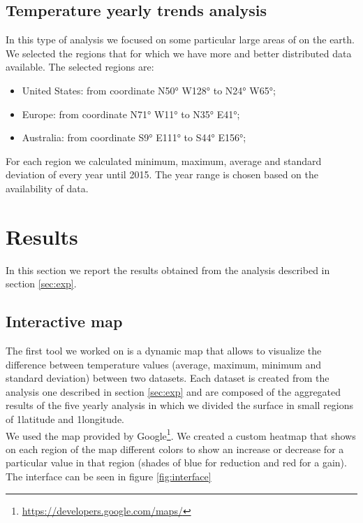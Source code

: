 \documentclass{vldb}
\begin{document}
\subsection{Temperature yearly trends analysis}
In this type of analysis we focused on some particular large areas of on the earth. We selected the regions that for which we have more and better distributed data available. The selected regions are:
\begin{itemize}
    \item United States: from coordinate N\ang{50;;} W\ang{128;;} to N\ang{24;;} W\ang{65;;};
    \item Europe: from coordinate N\ang{71;;} W\ang{11;;} to N\ang{35;;} E\ang{41;;};
    \item Australia: from coordinate S\ang{9;;} E\ang{111;;} to S\ang{44;;} E\ang{156;;};
\end{itemize}
For each region we calculated minimum, maximum, average and standard deviation of every year until 2015. The year range is chosen based on the availability of data. 

\section{Results}
\label{sec:res}
In this section we report the results obtained from the analysis described in section \ref{sec:exp}. 

\subsection{Interactive map}
\label{sec:map}
The first tool we worked on is a dynamic map that allows to visualize the difference between temperature values (average, maximum, minimum and standard deviation) between two datasets. Each dataset is created from the analysis one described in section \ref{sec:exp} and are composed of the aggregated results of the five yearly analysis in which we divided the surface in small regions of 1\degree latitude and 1\degree longitude. \\
We used the map provided by Google\footnote{\href{Google Maps}{https://developers.google.com/maps/}}. We created a custom heatmap that shows on each region of the map different colors to show an increase or decrease for a particular value in that region (shades of blue for reduction and red for a gain). The interface can be seen in figure \ref{fig:interface}
\end{document}
